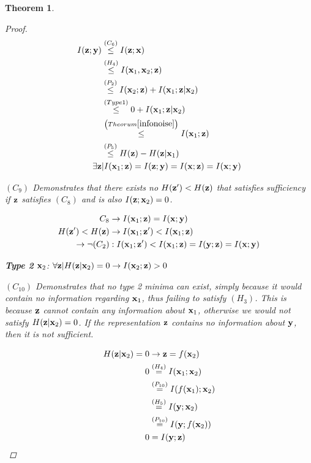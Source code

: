 \documentclass{article} %
\theoremstyle{plain}
\newtheorem{theorem}{Theorem}[section]
\theoremstyle{definition}
\theoremstyle{remark}
\begin{document}
\begin{theorem}
\begin{proof}
$$
\begin{aligned}
    I({\mathbf{z}}; {\mathbf{y}})&\stackrel{\left(C_6\right)}{\leq} I({\mathbf{z}}; {\mathbf{x}})  \\
    &\stackrel{\left(H_4\right)}{\leq}  I({\mathbf{x}}_1, {\mathbf{x}}_2; {\mathbf{z}}) \\
    &\stackrel{\left(P_2\right)}{\leq} I({\mathbf{x}}_2; {\mathbf{z}}) + I({\mathbf{x}}_1; {\mathbf{z}}| {\mathbf{x}}_2)\\
    &\stackrel{\left(Type1\right)}{\leq} 0 + I({\mathbf{x}}_1; {\mathbf{z}}| {\mathbf{x}}_2)\\
    &\stackrel{\left(Theorum\ref{infonoise}\right)}{\leq} I({\mathbf{x}}_1; {\mathbf{z}})\\
    &\stackrel{\left(P_5\right)}{\leq} H({\mathbf{z}}) - H({\mathbf{z}}| {\mathbf{x}}_1)\\
    \exists {\mathbf{z}} &|I({\mathbf{x}}_1; {\mathbf{z}})  = I({\mathbf{z}}; {\mathbf{y}}) = I({\mathbf{x}}; {\mathbf{z}}) = I({\mathbf{x}}; {\mathbf{y}})
\end{aligned}
$$

$(C_{9})$ Demonstrates that there exists no $H({\mathbf{z}}') < H({\mathbf{z}})$ that satisfies sufficiency if ${\mathbf{z}}$ satisfies $(C_8)$ and is also $I({\mathbf{z}}; {\mathbf{x}}_2) = 0$. 

$$
\begin{aligned}
    C_8 &\rightarrow  I({\mathbf{x}}_1; {\mathbf{z}}) = I({\mathbf{x}}; {\mathbf{y}})\\
    H({\mathbf{z}}') < H({\mathbf{z}}) & \rightarrow I({\mathbf{x}}_1; {\mathbf{z}}') < I({\mathbf{x}}_1; {\mathbf{z}}) \\
    \rightarrow \neg (C_2) &: I({\mathbf{x}}_1; {\mathbf{z}}') < I({\mathbf{x}}_1; {\mathbf{z}}) = I({\mathbf{y}}; {\mathbf{z}}) = I({\mathbf{x}}; {\mathbf{y}})
\end{aligned}
$$

\textbf{Type 2} ${\mathbf{x}}_2$: $\forall {\mathbf{z}}|H({\mathbf{z}}| {\mathbf{x}}_2)=0 \rightarrow I({\mathbf{x}}_2; {\mathbf{z}}) > 0$

$(C_{10})$ Demonstrates that no type 2 minima can exist, simply because it would contain no information regarding ${\mathbf{x}}_1$, thus failing to satisfy $(H_3)$. This is because ${\mathbf{z}}$ cannot contain any information about ${\mathbf{x}}_1$, otherwise we would not satisfy $H({\mathbf{z}}|{\mathbf{x}}_2)=0$. If the representation ${\mathbf{z}}$ contains no information about ${\mathbf{y}}$, then it is not sufficient. 

$$
\begin{aligned}
    H({\mathbf{z}}| {\mathbf{x}}_2) = 0 & \rightarrow {\mathbf{z}} = f({\mathbf{x}}_2) \\
    0 &\stackrel{\left(H_4\right)}{=} I({\mathbf{x}}_1; {\mathbf{x}}_2)\\
    &\stackrel{\left(P_{10}\right)}{=} I(f({\mathbf{x}}_1);{\mathbf{x}}_2)\\
    &\stackrel{\left(H_5\right)}{=} I({\mathbf{y}}; {\mathbf{x}}_2)\\
    &\stackrel{\left(P_{10}\right)}{=} I({\mathbf{y}};f({\mathbf{x}}_2))\\
    0&=I({\mathbf{y}};{\mathbf{z}})
\end{aligned}
$$


\end{proof}
\end{theorem}
\end{document}
